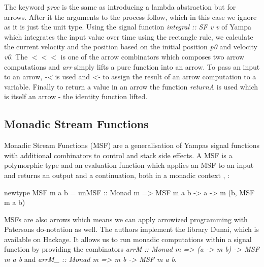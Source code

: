 The keyword \textit{proc} is the same as introducing a lambda abstraction but for arrows. After it the arguments to the process follow, which in this case we ignore as it is just the unit type. Using the signal function \textit{integral :: SF v v} of Yampa which integrates the input value over time using the rectangle rule, we calculate the current velocity and the position based on the initial position \textit{p0} and velocity \textit{v0}. The $<<<$ is one of the arrow combinators which composes two arrow computations and \textit{arr} simply lifts a pure function into an arrow. To pass an input to an arrow, \textit{-<} is used and \textit{<-} to assign the result of an arrow computation to a variable. Finally to return a value in an arrow the function \textit{returnA} is used which is itself an arrow - the identity function lifted.

\subsection{Monadic Stream Functions}
Monadic Stream Functions (MSF) are a generalisation of Yampas signal functions with additional combinators to control and stack side effects. A MSF is a polymorphic type and an evaluation function which applies an MSF to an input and returns an output and a continuation, both in a monadic context \cite{perez_functional_2016}, \cite{perez_extensible_2017}:
\begin{HaskellCode}
newtype MSF m a b = unMSF :: Monad m => MSF m a b -> a -> m (b, MSF m a b)
\end{HaskellCode}

MSFs are also arrows which means we can apply arrowized programming with Patersons do-notation as well. The authors \cite{perez_functional_2016} implement the library Dunai, which is available on Hackage. It allows us to run monadic computations within a signal function by providing the combinators \textit{arrM :: Monad m => (a -> m b) -> MSF m a b} and \textit{arrM\_ :: Monad m => m b -> MSF m a b}.